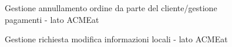 \documentclass[11pt]{article} %
\begin{document}
\begin{figure}[p]
\begin{center}
\caption{Gestione annullamento ordine da parte del cliente/gestione pagamenti - lato ACMEat}
\end{center}
\end{figure}

\clearpage

\begin{figure}[H]
\begin{center}
\caption{Gestione richiesta modifica informazioni locali - lato ACMEat}
\end{center}
\end{figure}
\end{document}

